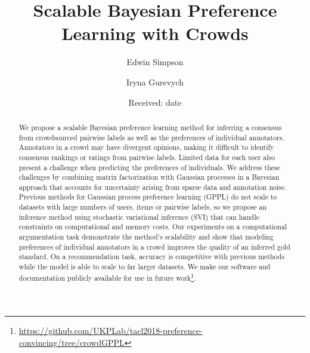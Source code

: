 \documentclass[smallcondensed,natbib]{svjour3}     %
\title{ 
Scalable Bayesian Preference Learning with Crowds
}
\author{Edwin Simpson 
\and Iryna Gurevych \\
}
\institute{Ubiquitous Knowledge Processing Lab, Dept. of Computer Science, Technische Universit\"at Darmstadt, Germany\\
              \email{\{simpson,gurevych\}@ukp.informatik.tu-darmstadt.de}
}
\date{Received: date}
\begin{document}

\maketitle

\begin{abstract}
We propose a scalable Bayesian preference learning method 
for inferring a consensus from crowdsourced pairwise labels 
as well as the preferences of individual annotators.
Annotators in a crowd may have divergent opinions, making it difficult to identify consensus rankings or ratings from
pairwise labels. Limited data for each user also present a challenge when predicting the preferences of individuals. 
We address these challenges by combining matrix factorization with 
Gaussian processes in a Bayesian approach that
accounts for uncertainty arising from sparse data and annotation noise.
Previous methods for Gaussian process preference learning (GPPL) do not scale to datasets with large numbers
 of users, items or pairwise labels, so we propose an inference method using stochastic variational inference (SVI)
that can handle constraints on computational and memory costs.
Our experiments on a computational argumentation task
demonstrate the method's scalability and
 show that modeling preferences of individual annotators in a crowd improves the quality of
an inferred gold standard.
On a recommendation task, accuracy is competitive with previous methods
 while the model is able to scale to far larger datasets.
We make our software and documentation publicly available for use in future 
work\footnote{\url{https://github.com/UKPLab/tacl2018-preference-convincing/tree/crowdGPPL}}.

\end{abstract}
\end{document}
